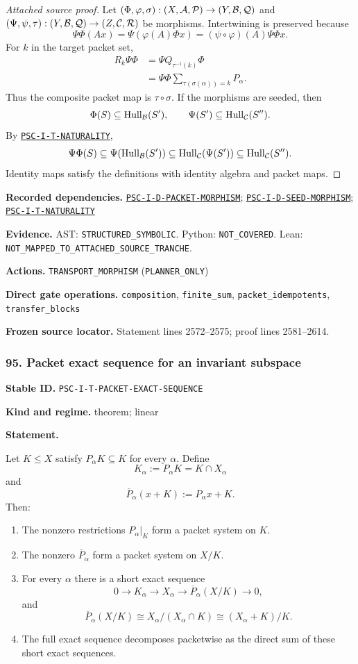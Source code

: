 \documentclass[a4paper,11pt]{article}
\newcommand{\Hull}{\operatorname{Hull}}\newcommand{\srank}{\operatorname{srank}}\newcommand{\psrank}{\operatorname{psrank}}\newcommand{\End}{\operatorname{End}}\newcommand{\Hom}{\operatorname{Hom}}\newcommand{\im}{\operatorname{im}}\newcommand{\Ker}{\operatorname{Ker}}\newcommand{\Jac}{\operatorname{Jac}}\newcommand{\Irr}{\operatorname{Irr}}\newcommand{\Span}{\operatorname{span}}\newcommand{\alg}{\operatorname{alg}}\newcommand{\Reach}{\operatorname{Reach}}\newcommand{\Supp}{\operatorname{Supp}}\newcommand{\id}{\mathrm{id}}\newcommand{\cl}[1]{\overline{#1}}
\newcommand{\field}[2]{\noindent\textbf{#1.} #2\par}
\begin{document}
\begin{proof}[Attached source proof]
Let $(\Phi,\varphi,\sigma):(X,\mathcal A,\mathcal P)\to(Y,\mathcal B,\mathcal Q)$ and $(\Psi,\psi,\tau):(Y,\mathcal B,\mathcal Q)\to(Z,\mathcal C,\mathcal R)$ be morphisms.  Intertwining is preserved because
\[
\Psi\Phi(Ax)
=
\Psi(\varphi(A)\Phi x)
=
(\psi\circ\varphi)(A)\Psi\Phi x.
\]
For $k$ in the target packet set,
\begin{align*}
R_k\Psi\Phi
&=\Psi Q_{\tau^{-1}(k)}\Phi\\
&=\Psi\Phi
\sum_{\tau(\sigma(\alpha))=k}P_\alpha.
\end{align*}
Thus the composite packet map is $\tau\circ\sigma$.  If the morphisms are seeded, then
\[
\Phi(S)\subseteq\Hull_\B(S'),
\qquad
\Psi(S')\subseteq\Hull_\Ccal(S'').
\]
By \hyperref[rec:PSC-I-T-NATURALITY]{\nolinkurl{PSC-I-T-NATURALITY}},
\[
\Psi\Phi(S)
\subseteq
\Psi(\Hull_\B(S'))
\subseteq
\Hull_\Ccal(\Psi(S'))
\subseteq
\Hull_\Ccal(S'').
\]
Identity maps satisfy the definitions with identity algebra and packet maps.
\end{proof}
\field{Recorded dependencies}{\hyperref[rec:PSC-I-D-PACKET-MORPHISM]{\nolinkurl{PSC-I-D-PACKET-MORPHISM}}; \hyperref[rec:PSC-I-D-SEED-MORPHISM]{\nolinkurl{PSC-I-D-SEED-MORPHISM}}; \hyperref[rec:PSC-I-T-NATURALITY]{\nolinkurl{PSC-I-T-NATURALITY}}}
\field{Evidence}{AST: \nolinkurl{STRUCTURED_SYMBOLIC}. Python: \nolinkurl{NOT_COVERED}. Lean: \nolinkurl{NOT_MAPPED_TO_ATTACHED_SOURCE_TRANCHE}.}
\field{Actions}{\nolinkurl{TRANSPORT_MORPHISM} (\nolinkurl{PLANNER_ONLY})}
\field{Direct gate operations}{\nolinkurl{composition}, \nolinkurl{finite_sum}, \nolinkurl{packet_idempotents}, \nolinkurl{transfer_blocks}}
\field{Frozen source locator}{Statement lines 2572--2575; proof lines 2581--2614.}
\subsubsection*{95. Packet exact sequence for an invariant subspace}
\label{rec:PSC-I-T-PACKET-EXACT-SEQUENCE}
\field{Stable ID}{\nolinkurl{PSC-I-T-PACKET-EXACT-SEQUENCE}}
\field{Kind and regime}{theorem; linear}
\textbf{Statement.}\par
Let $K\leq X$ satisfy $P_\alpha K\subseteq K$ for every $\alpha$.  Define
\[
K_\alpha:=P_\alpha K=K\cap X_\alpha
\]
and
\[
\overline P_\alpha(x+K):=P_\alpha x+K.
\]
Then:
\begin{enumerate}[label=(\roman*)]
\item The nonzero restrictions $P_\alpha|_K$ form a packet system on $K$.
\item The nonzero $\overline P_\alpha$ form a packet system on $X/K$.
\item For every $\alpha$ there is a short exact sequence
\[
0\longrightarrow K_\alpha
\longrightarrow X_\alpha
\longrightarrow \overline P_\alpha(X/K)
\longrightarrow0,
\]
and
\[
\overline P_\alpha(X/K)
\cong
X_\alpha/(X_\alpha\cap K)
\cong
(X_\alpha+K)/K.
\]
\item The full exact sequence decomposes packetwise as the direct sum of these short exact sequences.
\end{enumerate}
\end{document}
